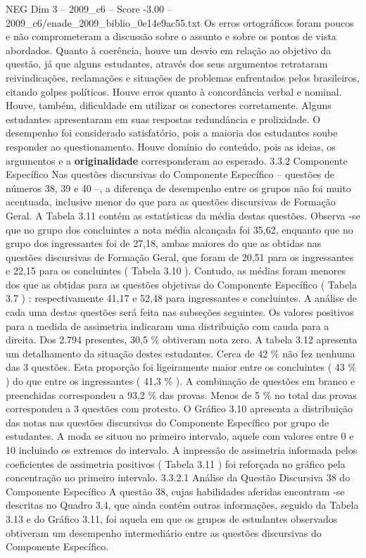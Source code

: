 \begin{textsample}{NEG Dim 3 – 2009\_c6 – Score -3.00 – 2009\_c6/enade\_2009\_biblio\_0e14e9ac55.txt}
Os erros ortográficos foram poucos e não comprometeram a discussão sobre o assunto e sobre os pontos de vista abordados.
Quanto à coerência, houve um desvio em relação ao objetivo da questão, já que alguns estudantes, através dos seus argumentos retrataram reivindicações, reclamações e situações de problemas enfrentados pelos brasileiros, citando golpes políticos.
Houve erros quanto à concordância verbal e nominal.
Houve, também, dificuldade em utilizar os conectores corretamente.
Alguns estudantes apresentaram em suas respostas redundância e prolixidade.
O desempenho foi considerado satisfatório, pois a maioria dos estudantes soube responder ao questionamento.
Houve domínio do conteúdo, pois as ideias, os argumentos e a \textbf{originalidade} corresponderam ao esperado. 3.3.2 Componente Específico Nas questões discursivas do Componente Específico – questões de números 38, 39 e 40 –, a diferença de desempenho entre os grupos não foi muito acentuada, inclusive menor do que para as questões discursivas de Formação Geral.
A Tabela 3.11 contém as estatísticas da média destas questões.
Observa -se que no grupo dos concluintes a nota média alcançada foi 35,62, enquanto que no grupo dos ingressantes foi de 27,18, ambas maiores do que as obtidas nas questões discursivas de Formação Geral, que foram de 20,51 para os ingressantes e 22,15 para os concluintes ( Tabela 3.10 ).
Contudo, as médias foram menores dos que as obtidas para as questões objetivas do Componente Específico ( Tabela 3.7 ) : respectivamente 41,17 e 52,48 para ingressantes e concluintes.
A análise de cada uma destas questões será feita nas subseções seguintes.
Os valores positivos para a medida de assimetria indicaram uma distribuição com cauda para a direita.
Dos 2.794 presentes, 30,5 \% obtiveram nota zero.
A tabela 3.12 apresenta um detalhamento da situação destes estudantes.
Cerca de 42 \% não fez nenhuma das 3 questões.
Esta proporção foi ligeiramente maior entre os concluintes ( 43 \% ) do que entre os ingressantes ( 41,3 \% ).
A combinação de questões em branco e preenchidas correspondeu a 93,2 \% das provas.
Menos de 5 \% no total das provas correspondeu a 3 questões com protesto.
O Gráfico 3.10 apresenta a distribuição das notas nas questões discursivas do Componente Específico por grupo de estudantes.
A moda se situou no primeiro intervalo, aquele com valores entre 0 e 10 incluindo os extremos do intervalo.
A impressão de assimetria informada pelos coeficientes de assimetria positivos ( Tabela 3.11 ) foi reforçada no gráfico pela concentração no primeiro intervalo. 3.3.2.1 Análise da Questão Discursiva 38 do Componente Específico A questão 38, cujas habilidades aferidas encontram -se descritas no Quadro 3.4, que ainda contém outras informações, seguido da Tabela 3.13 e do Gráfico 3.11, foi aquela em que os grupos de estudantes observados obtiveram um desempenho intermediário entre as questões discursivas do Componente Específico.

\end{textsample}
